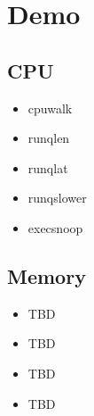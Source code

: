 \documentclass{beamer}
\begin{document}
\begin{frame}
  \begin{figure}
    \centering
    \noindent{}
  \end{figure}
\end{frame}


\section{Demo}

\subsection{CPU}
\begin{frame}
	\begin{itemize}
		\item<+-> cpuwalk
		\item<+-> runqlen
		\item<+-> runqlat
		\item<+-> runqslower
		\item<+-> execsnoop
	\end{itemize}
\end{frame}

\subsection{Memory}
\begin{frame}
	\begin{itemize}
		\item<+-> TBD
		\item<+-> TBD 
		\item<+-> TBD
		\item<+-> TBD
	\end{itemize}
\end{frame}
\end{document}
